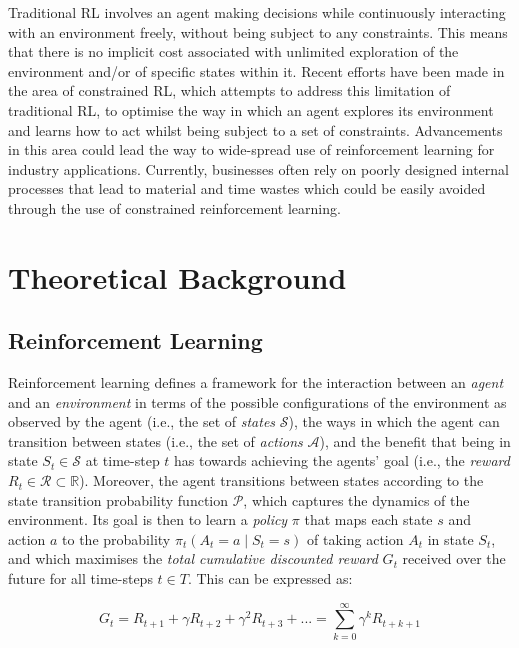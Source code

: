 \documentclass[12pt,twoside]{report}
\begin{document}
\smallskip

Traditional RL involves an agent making decisions while continuously interacting with an environment freely, without being subject to any constraints. This means that there is no implicit cost associated with unlimited exploration of the environment and/or of specific states within it. Recent efforts have been made in the area of constrained RL, which attempts to address this limitation of traditional RL, to optimise the way in which an agent explores its environment and learns how to act whilst being subject to a set of constraints. Advancements in this area could lead the way to wide-spread use of reinforcement learning for industry applications. Currently, businesses often rely on poorly designed internal processes that lead to material and time wastes which could be easily avoided through the use of constrained reinforcement learning. 

\chapter{Theoretical Background}

\section{Reinforcement Learning}

Reinforcement learning defines a framework for the interaction between an \textit{agent} and an \textit{environment} in terms of the possible configurations of the environment as observed by the agent (i.e., the set of \textit{states} $\mathcal{S}$), the ways in which the agent can transition between states (i.e., the set of \textit{actions}  $\mathcal{A}$), and the benefit that being in state $S_t \in \mathcal{S}$ at time-step $t$ has towards achieving the agents' goal (i.e., the \textit{reward} $R_t \in \mathcal{R} \subset \mathbb{R}$). Moreover, the agent transitions between states according to the state transition probability function $\mathcal{P}$, which captures the dynamics of the environment. Its goal is then to learn a \textit{policy} $\pi$ that maps each state $s$ and action $a$ to the probability $\pi_t\!\left(A_t = a \! \mid \! S_t = s\right)$ of taking action $A_t$ in state $S_t$, and which maximises the \textit{total cumulative discounted reward} $G_t$ received over the future for all time-steps $t \in T$. This can be expressed as: 

\begin{equation}
    G_t = R_{t+1} + \gamma R_{t+2} + \gamma^2 R_{t+3} + ... = \sum_{k=0}^\infty \gamma^k R_{t+k+1}
\end{equation}
\end{document}
